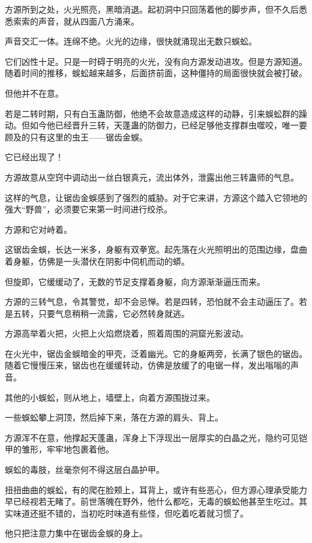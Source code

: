 \begin{this_body}
方源所到之处，火光照亮，黑暗消退。起初洞中只回荡着他的脚步声，但不久后悉悉索索的声音，就从四面八方涌来。

声音交汇一体。连绵不绝。火光的边缘，很快就涌现出无数只蜈蚣。

它们凶性十足。只是一时碍于明亮的火光，没有向方源发动进攻。但是方源知道。随着时间的推移，蜈蚣越来越多，后面挤前面，这种僵持的局面很快就会被打破。

但他并不在意。

若是二转时期，只有白玉蛊防御，他绝不会故意造成这样的动静，引来蜈蚣群的躁动。但如今他已经晋升三转，天蓬蛊的防御力，已经足够他支撑群虫噬咬，唯一要顾及的只有这里的虫王——锯齿金蜈。

它已经出现了！

方源故意从空窍中调动出一丝白银真元，流出体外，泄露出他三转蛊师的气息。

这样的气息，让锯齿金蜈感到了强烈的威胁。对于它来讲，方源这个踏入它领地的强大“野兽”，必须要它来第一时间进行绞杀。

方源和它对峙着。

这锯齿金蜈，长达一米多，身躯有双拳宽。起先落在火光照明出的范围边缘，盘曲着身躯，仿佛是一头潜伏在阴影中伺机而动的蟒。

但旋即，它缓缓动了，无数的节足支撑着身躯，向方源渐渐逼压而来。

方源的三转气息，令其警觉，却不会忌惮。若是四转，恐怕就不会主动逼压了。若是五转，只要气息稍稍一流露，它必然转身就逃。

方源高举着火把，火把上火焰燃烧着，照着周围的洞窟光影波动。

在火光中，锯齿金蜈暗金的甲壳，泛着幽光。它的身躯两旁，长满了银色的锯齿。随着它慢慢压来，锯齿也在缓缓转动，仿佛是放缓了的电锯一样，发出嗡嗡的声音。

其他的小蜈蚣，则从地上，墙壁上，向着方源围拢过来。

一些蜈蚣攀上洞顶，然后掉下来，落在方源的肩头、背上。

方源浑不在意，他撑起天蓬蛊，浑身上下浮现出一层厚实的白晶之光，隐约可见铠甲的雏形，牢牢地包裹着他。

蜈蚣的毒肢，丝毫奈何不得这层白晶护甲。

扭扭曲曲的蜈蚣，有的爬在脸颊上，耳背上，或许有些恶心，但方源心理承受能力早已经视若无睹了。前世落魄在野外，他什么都吃，无毒的蜈蚣他甚至生吃过。其实味道还挺不错的，当初吃时味道有些怪，但吃着吃着就习惯了。

他只把注意力集中在锯齿金蜈的身上。


\end{this_body}
